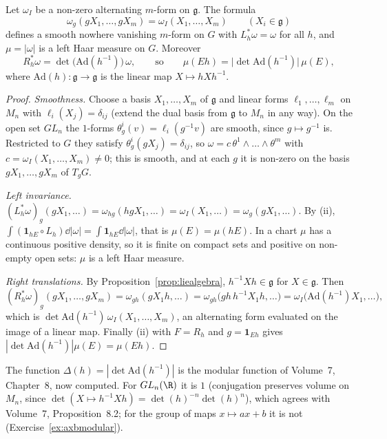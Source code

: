 \begin{theorem}\label{thm:haarform}
Let $\omega_I$ be a non-zero alternating $m$-form on $\mathfrak g$. The formula
\[\omega_g(gX_1,\dots,gX_m)=\omega_I(X_1,\dots,X_m)\qquad(X_i\in\mathfrak g)\]
defines a smooth nowhere vanishing $m$-form on $G$ with $L_h^*\omega=\omega$ for all $h$, and $\mu=|\omega|$ is a left Haar measure on $G$. Moreover
\[R_h^*\omega=\det\bigl(\mathrm{Ad}(h^{-1})\bigr)\,\omega,\qquad\text{so}\qquad\mu(Eh)=\bigl|\det\mathrm{Ad}(h^{-1})\bigr|\,\mu(E),\]
where $\mathrm{Ad}(h)\colon\mathfrak g\to\mathfrak g$ is the linear map $X\mapsto hXh^{-1}$.
\end{theorem}

\begin{proof}
\emph{Smoothness.} Choose a basis $X_1,\dots,X_m$ of $\mathfrak g$ and linear forms $\ell_1,\dots,\ell_m$ on $M_n$ with $\ell_i(X_j)=\delta_{ij}$ (extend the dual basis from $\mathfrak g$ to $M_n$
in any way). On the open set $GL_n$ the $1$-forms $\theta^i_g(v)=\ell_i(g^{-1}v)$ are smooth, since $g\mapsto g^{-1}$ is. Restricted to $G$ they satisfy $\theta^i_g(gX_j)=\delta_{ij}$, so
$\omega=c\,\theta^1\wedge\dots\wedge\theta^m$ with $c=\omega_I(X_1,\dots,X_m)\neq0$; this is smooth, and at each $g$ it is non-zero on the basis $gX_1,\dots,gX_m$ of $T_gG$.

\emph{Left invariance.} $(L_h^*\omega)_g(gX_1,\dots)=\omega_{hg}(hgX_1,\dots)=\omega_I(X_1,\dots)=\omega_g(gX_1,\dots)$. By (ii), $\int(\mathbf 1_{hE}\circ L_h)\dd|\omega|=\int\mathbf 1_{hE}\dd|\omega|$, that is
$\mu(E)=\mu(hE)$. In a chart $\mu$ has a continuous positive density, so it is finite on compact sets and positive on non-empty open sets: $\mu$ is a left Haar measure.

\emph{Right translations.} By Proposition~\ref{prop:liealgebra}, $h^{-1}Xh\in\mathfrak g$ for $X\in\mathfrak g$. Then
\[(R_h^*\omega)_g(gX_1,\dots,gX_m)=\omega_{gh}(gX_1h,\dots)=\omega_{gh}\bigl(gh\,h^{-1}X_1h,\dots\bigr)=\omega_I\bigl(\mathrm{Ad}(h^{-1})X_1,\dots\bigr),\]
which is $\det\mathrm{Ad}(h^{-1})\,\omega_I(X_1,\dots,X_m)$, an alternating form evaluated on the image of a linear map. Finally (ii) with $F=R_h$ and $g=\mathbf 1_{Eh}$ gives
$|\det\mathrm{Ad}(h^{-1})|\mu(E)=\mu(Eh)$.
\end{proof}

The function $\Delta(h)=|\det\mathrm{Ad}(h^{-1})|$ is the modular function of Volume~7, Chapter~8, now computed. For $GL_n(\R)$ it is $1$ (conjugation preserves volume on $M_n$, since
$\det(X\mapsto h^{-1}Xh)=\det(h)^{-n}\det(h)^n$), which agrees with Volume~7, Proposition~8.2; for the group of maps $x\mapsto ax+b$ it is not (Exercise~\ref{ex:axbmodular}).

